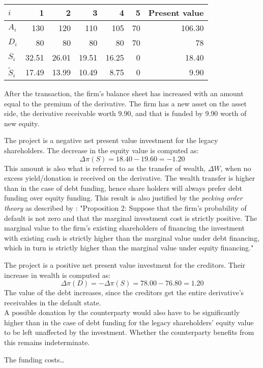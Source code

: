 \documentclass[../main.tex]{subfiles}
\begin{document}
        \begin{table}[h]
            \centering\begin{tabular}{l|rrrrr||r}
                $i$ & 1 & 2 & 3 & 4 & 5 & Present value \\
                \hline
                $A_{i}$ & 130 & 120 & 110 & 105 & 70 & 106.30 \\
                $D_{i}$ & 80 & 80 & 80 & 80 & 70 & 78 \\
                $S_{i}$ & 32.51 & 26.01 & 19.51 & 16.25 & 0 & 18.40 \\
                $\tilde{S}_{i}$ & 17.49 & 13.99 & 10.49 & 8.75 & 0 & 9.90 \\
            \end{tabular}
            \label{tbl:equity-funding-payoff}
        \end{table}

        After the transaction, the firm's balance sheet has increased with an amount equal to the premium of the derivative. The firm has a new asset on the asset side, the derivative receivable worth 9.90, and that is funded by 9.90 worth of new equity.

        The project is a negative net present value investment for the legacy shareholders. The decrease in the equity value is computed as:
        \begin{equation}
            \Delta \pi(S) = 18.40 - 19.60 = -1.20
        \end{equation}
        This amount is also what is referred to as the transfer of wealth, $\Delta W$, when no excess yield/donation is received on the derivative. The wealth transfer is higher than in the case of debt funding, hence share holders will always prefer debt funding over equity funding. This result is also justified by the \textit{pecking order theory} as described by \cite{ADS2016}: "Proposition 2: Suppose that the firm's probability of default is not zero and that the marginal investment cost is strictly positive. The marginal value to the firm's existing shareholders of financing the investment with existing cash is strictly higher than the marginal value under debt financing, which in turn is strictly higher than the marginal value under equity financing."

        The project is a positive net present value investment for the creditors. Their increase in wealth is computed as:
        \begin{equation}
            \Delta \pi(D) = -\Delta \pi(S) = 78.00 - 76.80 = 1.20
        \end{equation}
        The value of the debt increases, since the creditors get the entire derivative's receivables in the default state.\\
        A possible donation by the counterparty would also have to be significantly higher than in the case of debt funding for the legacy shareholders' equity value to be left unaffected by the investment. Whether the counterparty benefits from this remains indeterminate. 

        The funding costs\dots
\end{document}
